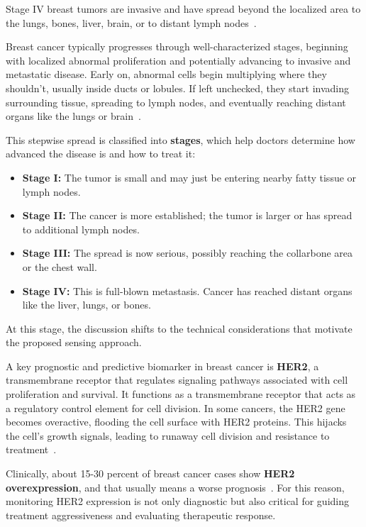 \documentclass[12pt,a4paper]{report}
\begin{document}
Stage IV breast tumors are invasive and have spread beyond the localized area to the lungs, bones, liver, brain, or to distant lymph nodes~\cite{biodigital}.


Breast cancer typically progresses through well-characterized stages, beginning with localized abnormal proliferation and potentially advancing to invasive and metastatic disease. Early on, abnormal cells begin multiplying where they shouldn’t, usually inside ducts or lobules. If left unchecked, they start invading surrounding tissue, spreading to lymph nodes, and eventually reaching distant organs like the lungs or brain~\cite{janeway2001,weissleder2004}.

This stepwise spread is classified into \textbf{stages}, which help doctors determine how advanced the disease is and how to treat it:

\begin{itemize}
    \item \textbf{Stage I:} The tumor is small and may just be entering nearby fatty tissue or lymph nodes.
    \item \textbf{Stage II:} The cancer is more established; the tumor is larger or has spread to additional lymph nodes.
    \item \textbf{Stage III:} The spread is now serious, possibly reaching the collarbone area or the chest wall.
    \item \textbf{Stage IV:} This is full-blown metastasis. Cancer has reached distant organs like the liver, lungs, or bones.
\end{itemize}

At this stage, the discussion shifts to the technical considerations that motivate the proposed sensing approach.

A key prognostic and predictive biomarker in breast cancer is \textbf{HER2}, a transmembrane receptor that regulates signaling pathways associated with cell proliferation and survival. It functions as a transmembrane receptor that acts as a regulatory control element for cell division. In some cancers, the HER2 gene becomes overactive, flooding the cell surface with HER2 proteins. This hijacks the cell’s growth signals, leading to runaway cell division and resistance to treatment~\cite{yarden2001}. 

Clinically, about 15-30 percent of breast cancer cases show \textbf{HER2 overexpression}, and that usually means a worse prognosis~\cite{kabel2017}. For this reason, monitoring HER2 expression is not only diagnostic but also critical for guiding treatment aggressiveness and evaluating therapeutic response.
 
\end{document}
